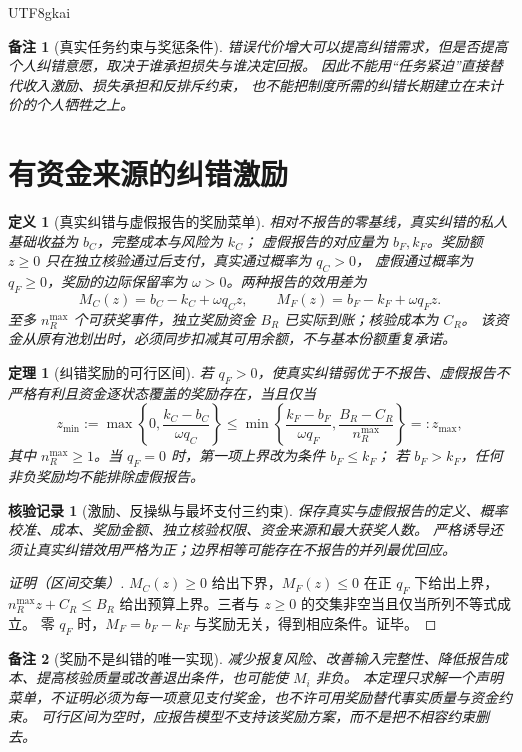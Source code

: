 \documentclass[12pt,a4paper,openany]{report}
\newtheorem{definition}{定义}[chapter]
\newtheorem{theorem}{定理}[chapter]
\newtheorem{remark}{备注}[chapter]
\newtheorem{Certificate}{核验记录}[chapter]
\begin{document}
\begin{CJK*}{UTF8}{gkai}
\begin{remark}[真实任务约束与奖惩条件]
错误代价增大可以提高纠错需求，但是否提高个人纠错意愿，取决于谁承担损失与谁决定回报。
因此不能用“任务紧迫”直接替代收入激励、损失承担和反排斥约束，
也不能把制度所需的纠错长期建立在未计价的个人牺牲之上。
\end{remark}

\section{有资金来源的纠错激励}

\begin{definition}[真实纠错与虚假报告的奖励菜单]
\label{def:reward-menu}
相对不报告的零基线，真实纠错的私人基础收益为 $b_C$，完整成本与风险为 $k_C$；
虚假报告的对应量为 $b_F,k_F$。奖励额 $z\ge0$ 只在独立核验通过后支付，真实通过概率为 $q_C>0$，
虚假通过概率为 $q_F\ge0$，奖励的边际保留率为 $\omega>0$。两种报告的效用差为
\[
 M_C(z)=b_C-k_C+\omega q_Cz,\qquad
 M_F(z)=b_F-k_F+\omega q_Fz.
\]
至多 $n_R^{\max}$ 个可获奖事件，独立奖励资金 $B_R$ 已实际到账；核验成本为 $C_R$。
该资金从原有池划出时，必须同步扣减其可用余额，不与基本份额重复承诺。
\end{definition}

\begin{theorem}[纠错奖励的可行区间]
\label{thm:reward-feasibility}
若 $q_F>0$，使真实纠错弱优于不报告、虚假报告不严格有利且资金逐状态覆盖的奖励存在，当且仅当
\[
 z_{\min}:=\max\left\{0,\frac{k_C-b_C}{\omega q_C}\right\}
 \le
 \min\left\{\frac{k_F-b_F}{\omega q_F},\frac{B_R-C_R}{n_R^{\max}}\right\}
 =:z_{\max},
\]
其中 $n_R^{\max}\ge1$。当 $q_F=0$ 时，第一项上界改为条件 $b_F\le k_F$；
若 $b_F>k_F$，任何非负奖励均不能排除虚假报告。
\end{theorem}
\begin{Certificate}[激励、反操纵与最坏支付三约束]
保存真实与虚假报告的定义、概率校准、成本、奖励金额、独立核验权限、资金来源和最大获奖人数。
严格诱导还须让真实纠错效用严格为正；边界相等可能存在不报告的并列最优回应。
\end{Certificate}
\begin{proof}[证明（区间交集）]
$M_C(z)\ge0$ 给出下界，$M_F(z)\le0$ 在正 $q_F$ 下给出上界，
$n_R^{\max}z+C_R\le B_R$ 给出预算上界。三者与 $z\ge0$ 的交集非空当且仅当所列不等式成立。
零 $q_F$ 时，$M_F=b_F-k_F$ 与奖励无关，得到相应条件。证毕。
\end{proof}

\begin{remark}[奖励不是纠错的唯一实现]
减少报复风险、改善输入完整性、降低报告成本、提高核验质量或改善退出条件，也可能使 $M_i$ 非负。
本定理只求解一个声明菜单，不证明必须为每一项意见支付奖金，也不许可用奖励替代事实质量与资金约束。
可行区间为空时，应报告模型不支持该奖励方案，而不是把不相容约束删去。
\end{remark}


\end{CJK*}
\end{document}
